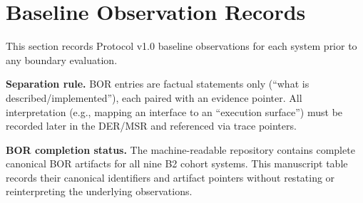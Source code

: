 \section{Baseline Observation Records}
\label{sec:bor}
This section records Protocol v1.0 baseline observations for each system prior to any boundary evaluation.

\textbf{Separation rule.} BOR entries are factual statements only (``what is described/implemented''), each paired with an evidence pointer. All interpretation (e.g., mapping an interface to an ``execution surface'') must be recorded later in the DER/MSR and referenced via trace pointers.

\textbf{BOR completion status.} The machine-readable repository contains complete canonical BOR artifacts for all nine B2 cohort systems. This manuscript table records their canonical identifiers and artifact pointers without restating or reinterpreting the underlying observations.

